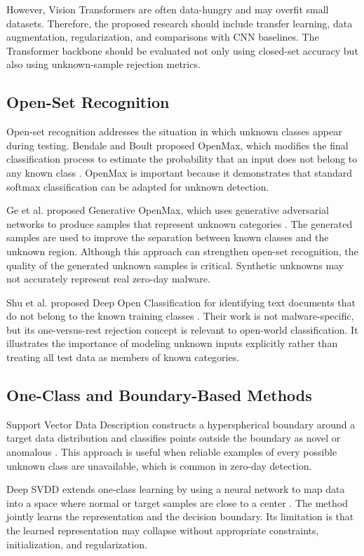 \documentclass[12pt,a4paper]{article}
\begin{document}
However, Vision Transformers are often data-hungry and may overfit small datasets. Therefore, the proposed research should include transfer learning, data augmentation, regularization, and comparisons with CNN baselines. The Transformer backbone should be evaluated not only using closed-set accuracy but also using unknown-sample rejection metrics.

\subsection{Open-Set Recognition}

Open-set recognition addresses the situation in which unknown classes appear during testing. Bendale and Boult proposed OpenMax, which modifies the final classification process to estimate the probability that an input does not belong to any known class \citep{bendale2016}. OpenMax is important because it demonstrates that standard softmax classification can be adapted for unknown detection.

Ge et al. proposed Generative OpenMax, which uses generative adversarial networks to produce samples that represent unknown categories \citep{ge2017}. The generated samples are used to improve the separation between known classes and the unknown region. Although this approach can strengthen open-set recognition, the quality of the generated unknown samples is critical. Synthetic unknowns may not accurately represent real zero-day malware.

Shu et al. proposed Deep Open Classification for identifying text documents that do not belong to the known training classes \citep{shu2017}. Their work is not malware-specific, but its one-versus-rest rejection concept is relevant to open-world classification. It illustrates the importance of modeling unknown inputs explicitly rather than treating all test data as members of known categories.

\subsection{One-Class and Boundary-Based Methods}

Support Vector Data Description constructs a hyperspherical boundary around a target data distribution and classifies points outside the boundary as novel or anomalous \citep{tax2004}. This approach is useful when reliable examples of every possible unknown class are unavailable, which is common in zero-day detection.

Deep SVDD extends one-class learning by using a neural network to map data into a space where normal or target samples are close to a center \citep{ruff2018}. The method jointly learns the representation and the decision boundary. Its limitation is that the learned representation may collapse without appropriate constraints, initialization, and regularization.
\end{document}
